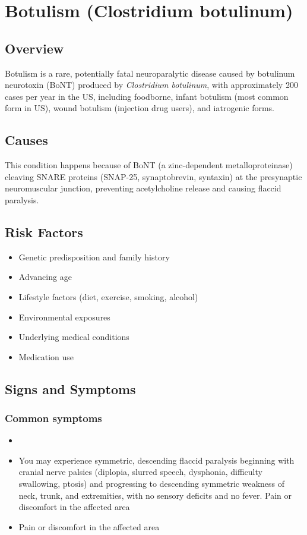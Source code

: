 \chapter{Botulism (Clostridium botulinum)}
\label{sec:Botulism}

\section{Overview}
Botulism is a rare, potentially fatal neuroparalytic disease caused by botulinum neurotoxin (BoNT) produced by \textit{Clostridium botulinum}, with approximately 200 cases per year in the US, including foodborne, infant botulism (most common form in US), wound botulism (injection drug users), and iatrogenic forms.
\section{Causes}
This condition happens because of BoNT (a zinc-dependent metalloproteinase) cleaving SNARE proteins (SNAP-25, synaptobrevin, syntaxin) at the presynaptic neuromuscular junction, preventing acetylcholine release and causing flaccid paralysis.     
\section{Risk Factors}

\begin{itemize}[noitemsep]
  \item Genetic predisposition and family history
  \item Advancing age
  \item Lifestyle factors (diet, exercise, smoking, alcohol)
  \item Environmental exposures
  \item Underlying medical conditions
  \item Medication use
\end{itemize}
\section{Signs and Symptoms}

\subsection{Common symptoms}
\begin{itemize}[noitemsep]
  \item \item You may experience symmetric, descending flaccid paralysis beginning with cranial nerve palsies (diplopia, slurred speech, dysphonia, difficulty swallowing, ptosis) and progressing to descending symmetric weakness of neck, trunk, and extremities, with no sensory deficits and no fever. Pain or discomfort in the affected area    \item Pain or discomfort in the affected area
  \end{itemize}

